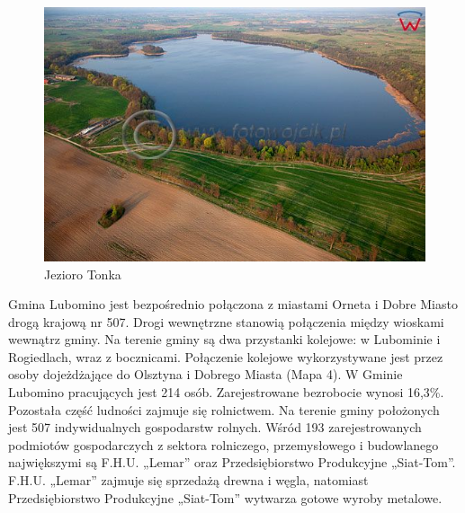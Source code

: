 \documentclass[a4paper,10pt]{article}
\begin{document}
    \begin{figure}[!htb]
    \centering
	\includegraphics[scale=0.5]{pics/zdjecie3.jpg}
	\caption{Jezioro Tonka}
    \end{figure}
    \newpage
    Gmina Lubomino jest bezpośrednio połączona z miastami Orneta i Dobre Miasto drogą krajową nr 507. Drogi wewnętrzne stanowią połączenia między wioskami wewnątrz gminy. 
    Na terenie gminy są dwa przystanki kolejowe: w Lubominie i Rogiedlach, wraz z bocznicami. 
    Połączenie kolejowe wykorzystywane jest przez osoby dojeżdżające do Olsztyna i Dobrego Miasta (Mapa 4).
    W Gminie Lubomino pracujących jest 214 osób. Zarejestrowane bezrobocie wynosi 16,3\%. 
    Pozostała część ludności zajmuje się rolnictwem. Na terenie gminy położonych jest 507 indywidualnych gospodarstw rolnych.
    Wśród 193 zarejestrowanych podmiotów gospodarczych z sektora rolniczego, przemysłowego i budowlanego największymi są F.H.U. „Lemar” oraz Przedsiębiorstwo Produkcyjne „Siat-Tom”. 
    F.H.U. „Lemar” zajmuje się sprzedażą drewna i węgla, natomiast Przedsiębiorstwo Produkcyjne „Siat-Tom” wytwarza gotowe wyroby metalowe.
\end{document}
